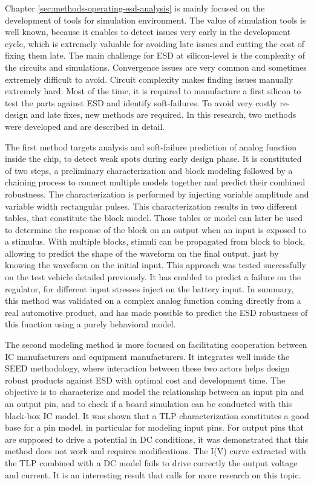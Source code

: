 Chapter \ref{sec:methods-operating-esd-analysis} is mainly focused on the development of tools for simulation environment.
The value of simulation tools is well known, because it enables to detect issues very early in the development cycle, which is extremely valuable for avoiding late issues and cutting the cost of fixing them late.
The main challenge for ESD at silicon-level is the complexity of the circuits and simulations.
Convergence issues are very common and sometimes extremely difficult to avoid.
Circuit complexity makes finding issues manually extremely hard.
Most of the time, it is required to manufacture a first silicon to test the parts against ESD and identify soft-failures.
To avoid very costly re-design and late fixes, new methods are required.
In this research, two methods were developed and are described in detail.

The first method targets analysis and soft-failure prediction of analog function inside the chip, to detect weak spots during early design phase.
It is constituted of two steps, a preliminary characterization and block modeling followed by a chaining process to connect multiple models together and predict their combined robustness.
The characterization is performed by injecting variable amplitude and variable width rectangular pulses.
This characterization results in two different tables, that constitute the block model.
Those tables or model can later be used to determine the response of the block on an output when an input is exposed to a stimulus.
With multiple blocks, stimuli can be propagated from block to block, allowing to predict the shape of the waveform on the final output, just by knowing the waveform on the initial input.
This approach was tested successfully on the test vehicle detailed previously.
It has enabled to predict a failure on the regulator, for different input stresses inject on the battery input.
In summary, this method was validated on a complex analog function coming directly from a real automotive product, and has made possible to predict the ESD robustness of this function using a purely behavioral model.

The second modeling method is more focused on facilitating cooperation between IC manufacturers and equipment manufacturers.
It integrates well inside the SEED methodology, where interaction between these two actors helps design robust products against ESD with optimal cost and development time.
The objective is to characterize and model the relationship between an input pin and an output pin, and to check if a board simulation can be conducted with this black-box IC model.
It was shown that a TLP characterization constitutes a good base for a pin model, in particular for modeling input pins.
For output pins that are supposed to drive a potential in DC conditions, it was demonstrated that this method does not work and requires modifications.
The I(V) curve extracted with the TLP combined with a DC model fails to drive correctly the output voltage and current.
It is an interesting result that calls for more research on this topic.

